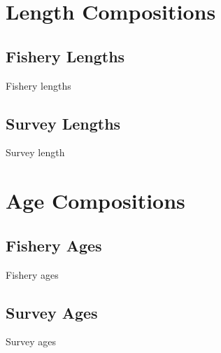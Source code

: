 \documentclass[pdf]{beamer}\usepackage[]{graphicx}\usepackage[]{color}
\begin{document}
\section{Length Compositions}
\subsection{Fishery Lengths}
\begin{frame}{Fishery}
  lengths
\end{frame}

\subsection{Survey Lengths}
\begin{frame}{Survey}
  length
\end{frame}

\section{Age Compositions}
\subsection{Fishery Ages}
\begin{frame}{Fishery}
  ages
\end{frame}

\subsection{Survey Ages}
\begin{frame}{Survey}
  ages
\end{frame}



\end{document}
